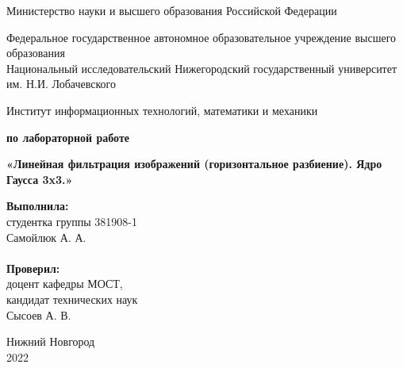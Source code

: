 \documentclass{report}
\begin{document}
\begin{titlepage}

\begin{center}
Министерство науки и высшего образования Российской Федерации
\end{center}

\begin{center}
Федеральное государственное автономное образовательное учреждение высшего образования \\
Национальный исследовательский Нижегородский государственный университет им. Н.И. Лобачевского
\end{center}

\begin{center}
Институт информационных технологий, математики и механики
\end{center}

\vspace{4em}

\begin{center}
\textbf{ по лабораторной работе} \\
\end{center}
\begin{center}
\textbf{\Large«Линейная фильтрация изображений (горизонтальное разбиение). Ядро Гаусса 3x3.»} \\
\end{center}

\vspace{4em}

\newbox{\lbox}
\newlength{\maxl}
\setlength{\maxl}{\wd\lbox}
\hfill\parbox{7cm}{
\hspace*{5cm}\hspace*{-5cm}\textbf{Выполнила:} \\ студентка группы 381908-1 \\ Самойлюк А. А.\\
\\
\hspace*{5cm}\hspace*{-5cm}\textbf{Проверил:}\\ доцент кафедры МОСТ, \\ кандидат технических наук \\ Сысоев А. В.\\
}
\vspace{\fill}

\begin{center} Нижний Новгород \\ 2022 \end{center}

\end{titlepage}
\end{document}
